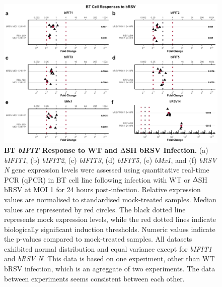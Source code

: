 \begin{figure}
    \centering
    \includegraphics[width=1\linewidth]{07. Chapter 2/Figs/02. Induction/09. bt_brsv.pdf}
    \caption[BT \textit{bIFIT} Response to WT and $\Updelta$SH bRSV Infection.]{\textbf{BT \textit{bIFIT} Response to WT and $\Updelta$SH bRSV Infection.} (a) \textit{bIFIT1}, (b) \textit{bIFIT2}, (c) \textit{bIFIT3}, (d) \textit{bIFIT5}, (e) \textit{bMx1}, and (f) \textit{bRSV N} gene expression levels were assessed using quantitative real-time PCR (qPCR) in BT cell line following infection with WT or $\Updelta$SH bRSV at MOI 1 for 24 hours post-infection. Relative expression values are normalised to standardised mock-treated samples. Median values are represented by red circles. The black dotted line represents mock expression levels, while the red dotted lines indicate biologically significant induction thresholds. Numeric values indicate the p-values compared to mock-treated samples. All datasets exhibited normal distribution and equal variance except for \textit{bIFIT1} and \textit{bRSV N}. This data is based on one experiment, other than WT bRSV infection, which is an agreggate of two experiments. The data between experiments seems consistent between each other.}
    \label{fig:BT responses to bRSV}
\end{figure}

